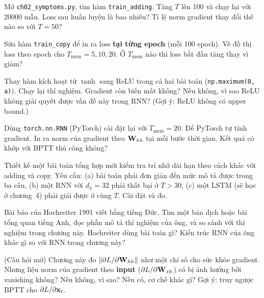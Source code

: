 \begin{bt}
  \item Mở \texttt{ch02_symptoms.py}, tìm hàm
    \texttt{train_adding}. Tăng $T$ lên 100 và chạy lại với
    20000 mẫu. Loss sau huấn luyện là bao nhiêu? Tỉ lệ norm gradient thay
    đổi thế nào so với $T=50$?

  \item Sửa hàm \texttt{train_copy} để in ra loss \textbf{tại
    từng epoch} (mỗi 100 epoch). Vẽ đồ thị loss theo epoch cho $T_{\text{mem}}
    = 5, 10, 20$. Ở $T_{\text{mem}}$ nào thì loss bắt đầu tăng thay vì giảm?

  \item Thay hàm kích hoạt từ $\tanh$ sang ReLU trong cả hai bài toán
    (\texttt{np.maximum(0, a)}). Chạy lại thí nghiệm. Gradient
    còn biến mất không? Nếu không, vì sao ReLU không giải quyết được vấn
    đề này trong RNN? (Gợi ý: ReLU không có upper bound.)

  \item Dùng \texttt{torch.nn.RNN} (PyTorch) cài đặt lại
     với $T_{\text{mem}} = 20$. Để PyTorch tự
    tính gradient.
    In ra norm của gradient theo $\mathbf{W}_{hh}$ tại mỗi bước thời gian.
    Kết quả có khớp với BPTT thủ công không?
\end{bt}

%

\tierextend

%

\begin{bt}
  \item Thiết kế một bài toán tổng hợp mới kiểm tra trí nhớ dài hạn theo
    cách khác với adding và copy. Yêu cầu: (a) bài toán phải đơn giản đến
    mức mô tả được trong ba câu, (b) một RNN với $d_h = 32$ phải thất bại
    ở $T > 30$, (c) một LSTM (sẽ học ở chương~4) phải giải được ở cùng $T$.
    Cài đặt và đo.

  \item Bài báo của Hochreiter 1991 viết bằng tiếng Đức. Tìm một bản dịch
    hoặc bài tổng quan tiếng Anh, đọc phần mô tả thí nghiệm của ông, và
    so sánh với thí nghiệm trong chương này. Hochreiter dùng bài toán gì?
    Kiến trúc RNN của ông khác gì so với RNN trong chương này?

  \item (Câu hỏi mở) Chương này đo $\|\partial L / \partial \mathbf{W}_{hh}\|$
    như một chỉ số cho sức khỏe gradient. Nhưng liệu norm của gradient theo
    \textbf{input} ($\partial L / \partial \mathbf{W}_{xh}$) có bị ảnh hưởng
    bởi vanishing không? Nếu không, vì sao? Nếu có, cơ chế khác gì? Gợi ý:
    truy ngược BPTT cho $\partial L / \partial \mathbf{x}_t$.
\end{bt}

%
